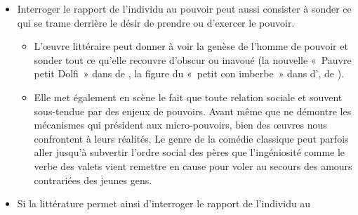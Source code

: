 {\begin{itemize}[label=\textbullet]
\begin{itemize}[label=]
l'on retrouve aussi bien dans des œuvres poétiques (nombre de  de  la soulèvent) que dans des pièces de théâtre tragiques () ou
comiques ().
\item Il s'agit alors de réfléchir aux pouvoirs propres de la fiction et de montrer les
spécificités du questionnement qu'elle déploie sans apporter de réponses
préconstruites – et sans doute même en les refusant. Elle peut aussi bien
inventer d'autres mondes où l'harmonie sociale et politique permet de dessiner
un idéal critique (les fictions utopiques en particulier), confronter le lecteur à des
univers anxiogènes sur lesquels s'abat un pouvoir tyrannique et totalitaire
(quelle échappatoire secret Winston Smith peut-il cultiver pour se dérober au
regard omniprésent de Big Brother dans le roman  d'~?), ou encore
indiquer les voies de la résistance à un pouvoir qui bafoue les valeurs
constitutives de l'individu libre.
\end{itemize}
\item Interroger le rapport de l'individu au pouvoir peut aussi consister à
sonder ce qui se trame derrière le désir de prendre ou d'exercer le
pouvoir.
\begin{itemize}[label=]
\item L'œuvre littéraire peut donner à voir la genèse de l'homme de pouvoir et
sonder tout ce qu'elle recouvre d'obscur ou inavoué (la nouvelle «~Pauvre
petit Dolfi~» dans  de , la figure du «~petit con imberbe~» dans
 d',  de
).
\item Elle met également en scène le fait que toute relation sociale et souvent
sous-tendue par des enjeux de pouvoirs. Avant même que  ne
démontre les mécanismes qui président aux micro-pouvoirs, bien des
œuvres nous confrontent à leurs réalités. Le genre de la comédie classique
peut parfois aller jusqu'à subvertir l'ordre social des pères que l'ingéniosité
comme le verbe des valets vient remettre en cause pour voler au secours
des amours contrariées des jeunes gens.
\end{itemize}
\item Si la littérature permet ainsi d'interroger le rapport de l'individu au

\end{itemize}}
